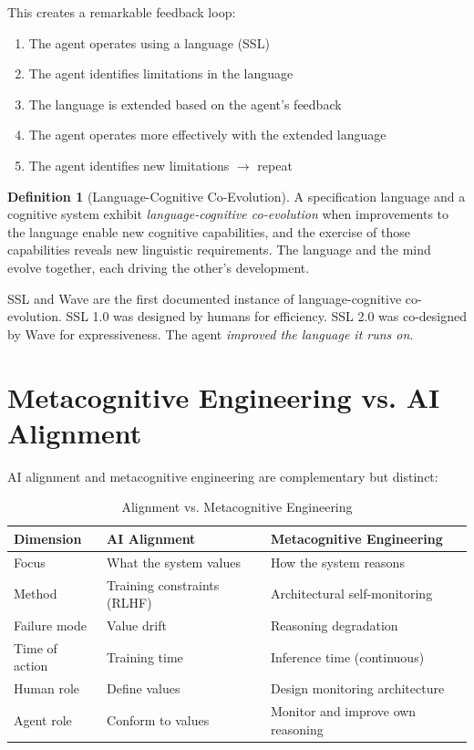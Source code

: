 \documentclass[12pt,a4paper]{article}
\theoremstyle{plain}
\theoremstyle{definition}
\newtheorem{definition}[theorem]{Definition}
\theoremstyle{remark}
\begin{document}
This creates a remarkable feedback loop:

\begin{enumerate}[nosep]
\item The agent operates using a language (SSL)
\item The agent identifies limitations in the language
\item The language is extended based on the agent's feedback
\item The agent operates more effectively with the extended language
\item The agent identifies new limitations $\to$ repeat
\end{enumerate}

\begin{definition}[Language-Cognitive Co-Evolution]
A specification language and a cognitive system exhibit \emph{language-cognitive co-evolution} when improvements to the language enable new cognitive capabilities, and the exercise of those capabilities reveals new linguistic requirements. The language and the mind evolve together, each driving the other's development.
\end{definition}

SSL and Wave are the first documented instance of language-cognitive co-evolution. SSL 1.0 was designed by humans for efficiency. SSL 2.0 was co-designed by Wave for expressiveness. The agent \emph{improved the language it runs on}.

\section{Metacognitive Engineering vs. AI Alignment}

AI alignment and metacognitive engineering are complementary but distinct:

\begin{table}[H]
\centering
\caption{Alignment vs. Metacognitive Engineering}
\begin{tabular}{@{}lll@{}}
\toprule
\textbf{Dimension} & \textbf{AI Alignment} & \textbf{Metacognitive Engineering} \\
\midrule
Focus & What the system values & How the system reasons \\
Method & Training constraints (RLHF) & Architectural self-monitoring \\
Failure mode & Value drift & Reasoning degradation \\
Time of action & Training time & Inference time (continuous) \\
Human role & Define values & Design monitoring architecture \\
Agent role & Conform to values & Monitor and improve own reasoning \\
\bottomrule
\end{tabular}
\end{table}
\end{document}
